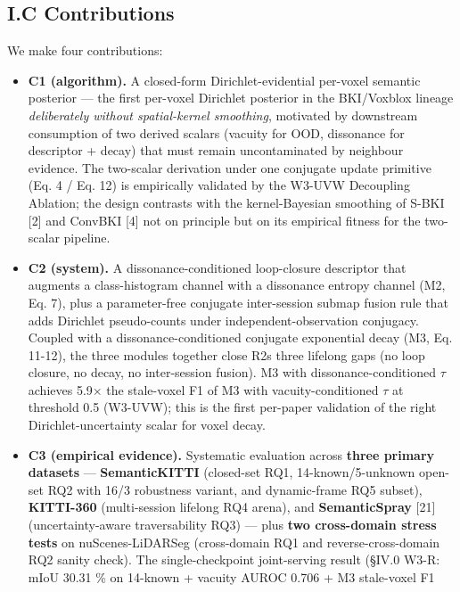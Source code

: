 \documentclass[
]{article}
\begin{document}
\subsection{I.C Contributions}\label{ic-contributions}

We make four contributions:

\begin{itemize}
\item
  \textbf{C1 (algorithm).} A closed-form Dirichlet-evidential per-voxel
  semantic posterior --- the first per-voxel Dirichlet posterior in the
  BKI/Voxblox lineage \emph{deliberately without spatial-kernel
  smoothing}, motivated by downstream consumption of two derived scalars
  (vacuity for OOD, dissonance for descriptor + decay) that must remain
  uncontaminated by neighbour evidence. The two-scalar derivation under
  one conjugate update primitive (Eq. 4 / Eq. 12) is empirically
  validated by the W3-UVW Decoupling Ablation; the design contrasts with
  the kernel-Bayesian smoothing of S-BKI {[}2{]} and ConvBKI {[}4{]} not
  on principle but on its empirical fitness for the two-scalar pipeline.
\item
  \textbf{C2 (system).} A dissonance-conditioned loop-closure descriptor
  that augments a class-histogram channel with a dissonance entropy
  channel (M2, Eq. 7), plus a parameter-free conjugate inter-session
  submap fusion rule that adds Dirichlet pseudo-counts under
  independent-observation conjugacy. Coupled with a
  dissonance-conditioned conjugate exponential decay (M3, Eq. 11-12),
  the three modules together close R2\textquotesingle s three lifelong
  gaps (no loop closure, no decay, no inter-session fusion). M3 with
  dissonance-conditioned \(\tau\) achieves 5.9× the stale-voxel F1 of M3
  with vacuity-conditioned \(\tau\) at threshold 0.5 (W3-UVW); this is
  the first per-paper validation of the right Dirichlet-uncertainty
  scalar for voxel decay.
\item
  \textbf{C3 (empirical evidence).} Systematic evaluation across
  \textbf{three primary datasets} --- \textbf{SemanticKITTI} (closed-set
  RQ1, 14-known/5-unknown open-set RQ2 with 16/3 robustness variant, and
  dynamic-frame RQ5 subset), \textbf{KITTI-360} (multi-session lifelong
  RQ4 arena), and \textbf{SemanticSpray} {[}21{]} (uncertainty-aware
  traversability RQ3) --- plus \textbf{two cross-domain stress tests} on
  nuScenes-LiDARSeg (cross-domain RQ1 and reverse-cross-domain RQ2
  sanity check). The single-checkpoint joint-serving result (§IV.0 W3-R:
  mIoU 30.31 \% on 14-known + vacuity AUROC 0.706 + M3 stale-voxel F1

\end{itemize}
\end{document}
